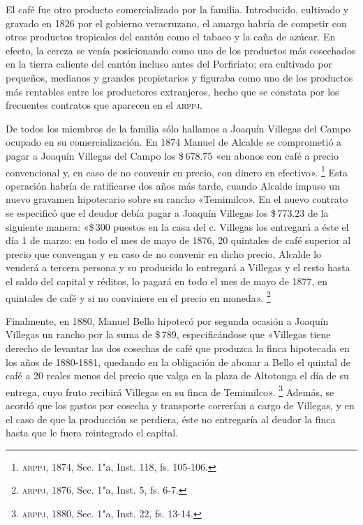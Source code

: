 \documentclass[14pt,twoside,final]{extbook} %
\let\oldfootnote\footnote
\renewcommand\footnote[1]{%
\oldfootnote{\hspace{1mm}#1}}
\begin{document}
El café fue otro producto comercializado por la familia. Introducido, cultivado y gravado en 1826 por el gobierno veracruzano, el amargo habría de competir con otros productos tropicales del cantón como el tabaco y la caña de azúcar. En efecto, la cereza se venía posicionando como uno de los productos más cosechados en la tierra caliente del cantón incluso antes del Porfiriato; era cultivado por pequeños, medianos y grandes propietarios y figuraba como uno de los productos más rentables entre los productores extranjeros, hecho que se constata por los frecuentes contratos que aparecen en el \textsc{arppj}.

De todos los miembros de la familia sólo hallamos a Joaquín Villegas del Campo ocupado en su comercialización. En 1874 Manuel de Alcalde se comprometió a pagar a Joaquín Villegas del Campo los \$\,678.75 «en abonos con café a precio convencional y, en caso de no convenir en precio, con dinero en efectivo».\footnote{\textsc{arppj}, 1874, Sec. 1"a, Inst. 118, fs. 105-106.} Esta operación habría de ratificarse dos años más tarde, cuando Alcalde impuso un nuevo gravamen hipotecario sobre su rancho «Temimilco». En el nuevo contrato se especificó que el deudor debía pagar a Joaquín Villegas los \$\,773.23 de la siguiente manera: «\$\,300 puestos en la casa del c. Villegas los entregará a éste el día 1 de marzo: en todo el mes de mayo de 1876, 20 quintales de café superior al precio que convengan y en caso de no convenir en dicho precio, Alcalde lo venderá a tercera persona y su producido lo entregará a Villegas y el resto hasta el saldo del capital y réditos, lo pagará en todo el mes de mayo de 1877, en quintales de café y si no conviniere en el precio en moneda».\footnote{\textsc{arppj}, 1876, Sec. 1"a, Inst. 5, fs. 6-7.}

Finalmente, en 1880, Manuel Bello hipotecó por segunda ocasión a Joaquín Villegas un rancho por la suma de \$\,789, especificándose que «Villegas tiene derecho de levantar las dos cosechas de café que produzca la finca hipotecada en los años de 1880-1881, quedando en la obligación de abonar a Bello el quintal de café a 20 reales menos del precio que valga en la plaza de Altotonga el día de su entrega, cuyo fruto recibirá Villegas en su finca de Temimilco».\footnote{\textsc{arppj}, 1880, Sec. 1"a, Inst. 22, fs. 13-14.} Además, se acordó que los gastos por cosecha y transporte correrían a cargo de Villegas, y en el caso de que la producción se perdiera, éste no entregaría al deudor la finca hasta que le fuera reintegrado el capital.
\end{document}
